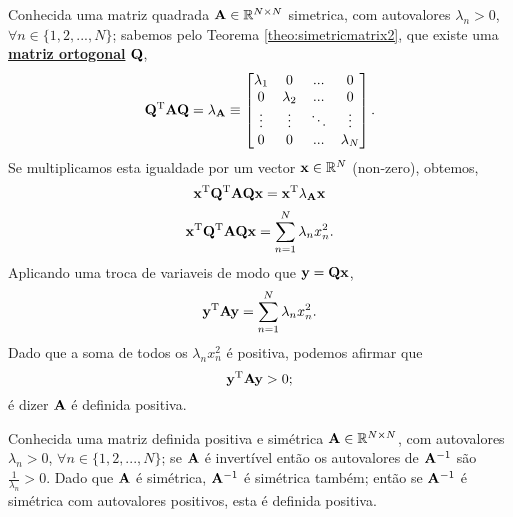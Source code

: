 \begin{myproofT}\label{proof:theo:positivematrix2}
Conhecida uma matriz quadrada $\MATRIX{A} \in \mathbb{R}^{N \times N}$ simetrica,
com  autovalores $\lambda_n>0$, $\forall n \in \{1, 2, ..., N\}$;
sabemos pelo Teorema \ref{theo:simetricmatrix2}, 
que existe uma \hyperref[def:ortogonalmatrix0]{\textbf{matriz ortogonal}} $\MATRIX{Q}$,
\begin{equation}
\MATRIX{Q}^{\transpose}\MATRIX{A}\MATRIX{Q} = \MATRIX{\lambda}_{\MATRIX{A}}\equiv
\begin{bmatrix}
\lambda_1 & 0         & ...    & 0 \\
0         & \lambda_2 & ...    & 0 \\
\vdots    & \vdots    & \ddots & \vdots \\
0         & 0         & ...    & \lambda_N
\end{bmatrix}.
\end{equation}
Se multiplicamos esta igualdade por um vector $\VECTOR{x} \in \mathbb{R}^N$ (non-zero), obtemos,
\begin{equation}
\VECTOR{x}^{\transpose} \MATRIX{Q}^{\transpose}\MATRIX{A}\MATRIX{Q} \VECTOR{x} = 
\VECTOR{x}^{\transpose} \MATRIX{\lambda}_{\MATRIX{A}} \VECTOR{x}
\end{equation}
\begin{equation}
\VECTOR{x}^{\transpose} \MATRIX{Q}^{\transpose}\MATRIX{A}\MATRIX{Q} \VECTOR{x} 
= \sum \limits_{n=1}^{N}\lambda_n x_n^2.
\end{equation}
Aplicando uma troca de variaveis de modo que $\VECTOR{y}=\MATRIX{Q} \VECTOR{x}$,
\begin{equation}
\VECTOR{y}^{\transpose} \MATRIX{A} \VECTOR{y} 
= \sum \limits_{n=1}^{N}\lambda_n x_n^2.
\end{equation}
Dado que a soma de todos os $\lambda_n x_n^2$ é positiva, podemos afirmar que
\begin{equation}
\VECTOR{y}^{\transpose} \MATRIX{A} \VECTOR{y} > 0;
\end{equation}
é dizer $\MATRIX{A}$ é definida positiva.
\end{myproofT}

\begin{myproofT}\label{proof:theo:positivematrix:2}
Conhecida uma matriz definida positiva e simétrica $\MATRIX{A} \in \mathbb{R}^{N \times N}$,
com  autovalores $\lambda_n>0$, $\forall n \in \{1, 2, ..., N\}$;
se $\MATRIX{A}$  é invertível então os autovalores de $\MATRIX{A}^{-1}$ são  $\frac{1}{\lambda_n}>0$.
Dado que $\MATRIX{A}$ é simétrica, $\MATRIX{A}^{-1}$ é simétrica também;
então se $\MATRIX{A}^{-1}$ é simétrica com autovalores positivos, esta é definida positiva.
\end{myproofT}


